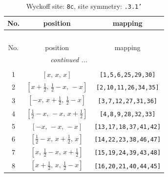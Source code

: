 \documentclass[fleqn,8pt]{jsarticle}
\begin{document}
\renewcommand{\arraystretch}{1.2}
\begin{longtable}{ccc}
\caption{Wyckoff site: {\tt 8c}, site symmetry: {\tt .3.1'}}
 \\
 \hline \hline
No. & position & mapping \\ \hline \endfirsthead

\multicolumn{2}{l}{\tablename\ \thetable{}} \\
 \hline \hline
No. & position & mapping \\ \hline \endhead

 \hline \hline
\multicolumn{2}{r}{\footnotesize\it continued ...} \\ \endfoot

 \hline \hline
\multicolumn{2}{r}{} \\ \endlastfoot

1 & $\left[ x,\, x,\, x \right]$ & {\tt [1,5,6,25,29,30]} \\ \hline
2 & $\left[ x + \frac{1}{2},\, \frac{1}{2} - x,\, - x \right]$ & {\tt [2,10,11,26,34,35]} \\ \hline
3 & $\left[ - x,\, x + \frac{1}{2},\, \frac{1}{2} - x \right]$ & {\tt [3,7,12,27,31,36]} \\ \hline
4 & $\left[ \frac{1}{2} - x,\, - x,\, x + \frac{1}{2} \right]$ & {\tt [4,8,9,28,32,33]} \\ \hline
5 & $\left[ - x,\, - x,\, - x \right]$ & {\tt [13,17,18,37,41,42]} \\ \hline
6 & $\left[ \frac{1}{2} - x,\, x + \frac{1}{2},\, x \right]$ & {\tt [14,22,23,38,46,47]} \\ \hline
7 & $\left[ x,\, \frac{1}{2} - x,\, x + \frac{1}{2} \right]$ & {\tt [15,19,24,39,43,48]} \\ \hline
8 & $\left[ x + \frac{1}{2},\, x,\, \frac{1}{2} - x \right]$ & {\tt [16,20,21,40,44,45]} \\
\end{longtable}
\renewcommand{\arraystretch}{1.2}
\end{document}
